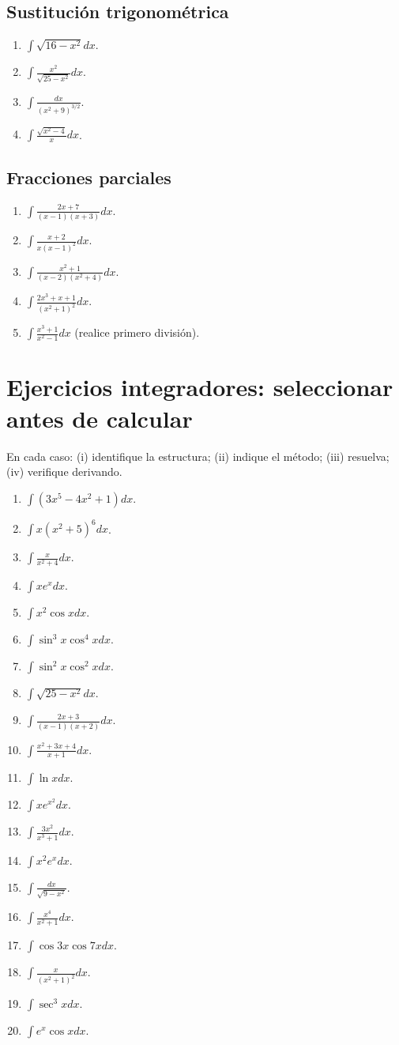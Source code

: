 \documentclass[12pt]{article}
\theoremstyle{definition}
\theoremstyle{remark}
\begin{document}
\subsection*{Sustitución trigonométrica}
\begin{enumerate}
\item $\int\sqrt{16-x^2}dx$.
\item $\int\frac{x^2}{\sqrt{25-x^2}}dx$.
\item $\int\frac{dx}{(x^2+9)^{3/2}}$.
\item $\int\frac{\sqrt{x^2-4}}{x}dx$.
\end{enumerate}
\subsection*{Fracciones parciales}
\begin{enumerate}
\item $\int\frac{2x+7}{(x-1)(x+3)}dx$.
\item $\int\frac{x+2}{x(x-1)^2}dx$.
\item $\int\frac{x^2+1}{(x-2)(x^2+4)}dx$.
\item $\int\frac{2x^3+x+1}{(x^2+1)^2}dx$.
\item $\int\frac{x^3+1}{x^2-1}dx$ (realice primero división).
\end{enumerate}

\section{Ejercicios integradores: seleccionar antes de calcular}
En cada caso: (i) identifique la estructura; (ii) indique el método; (iii) resuelva; (iv) verifique derivando.
\begin{enumerate}
\item $\int(3x^5-4x^2+1)dx$.
\item $\int x(x^2+5)^6dx$.
\item $\int\frac{x}{x^2+4}dx$.
\item $\int xe^xdx$.
\item $\int x^2\cos xdx$.
\item $\int\sin^3x\cos^4xdx$.
\item $\int\sin^2x\cos^2xdx$.
\item $\int\sqrt{25-x^2}dx$.
\item $\int\frac{2x+3}{(x-1)(x+2)}dx$.
\item $\int\frac{x^2+3x+4}{x+1}dx$.
\item $\int\ln xdx$.
\item $\int xe^{x^2}dx$.
\item $\int\frac{3x^2}{x^3+1}dx$.
\item $\int x^2e^xdx$.
\item $\int\frac{dx}{\sqrt{9-x^2}}$.
\item $\int\frac{x^4}{x^2+1}dx$.
\item $\int\cos3x\cos7xdx$.
\item $\int\frac{x}{(x^2+1)^2}dx$.
\item $\int\sec^3x dx$.
\item $\int e^x\cos xdx$.
\end{enumerate}
\end{document}
